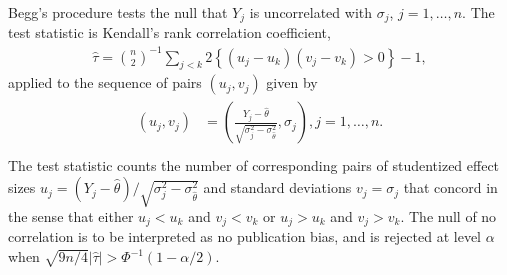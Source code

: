 \documentclass[12pt]{article}
\newcommand{\y}{Y}
\begin{document}
Begg's procedure tests the null that $\y_j$ is uncorrelated with
$\sigma_j$, $j=1,\ldots,n$.
    The test statistic is Kendall's rank
    correlation coefficient,
    \begin{align}
    \hat\tau={n\choose 2}^{-1}\sum_{j<k}2\left\{(u_j-u_k)(v_j-v_k)>0\right\} - 1,
      \label{defn:kendalls tau}
    \end{align}
    applied to the sequence of pairs $(u_j,v_j)$ given by %
    \begin{align}
      \begin{split}\label{defn:pairs}
        (u_j,v_j)&=\left(\frac{\y_j-\hat{\theta}}{\sqrt{\sigma_j^2-\sigma^2_{\hat{\theta}}}},\sigma_j\right),j=1,\ldots,n.\\
      \end{split}
    \end{align}
    The
    test statistic counts the number of corresponding pairs of
    studentized effect sizes
    $u_j=(\y_j-\hat{\theta})/\sqrt{\sigma_j^2-\sigma^2_{\hat{\theta}}}$
    and standard deviations $v_j=\sigma_j$ that concord in
    the sense that either $u_j<u_k$ and $v_j<v_k$ or $u_j>u_k$ and
    $v_j>v_k$. The null of no correlation is to be interpreted as no
    publication bias, and is rejected at level $\alpha$ when
    $\sqrt{9n/4}|\hat\tau| > \Phi^{-1}(1-\alpha/2)$. %

\end{document}
